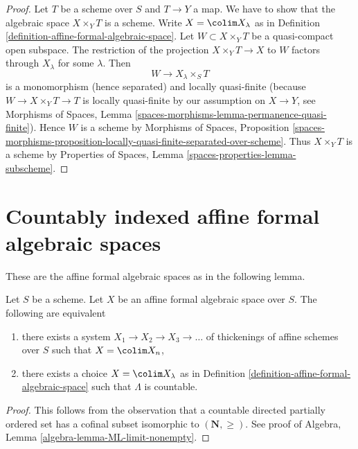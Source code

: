 \begin{proof}
Let $T$ be a scheme over $S$ and $T \to Y$ a map. We have to show that
the algebraic space $X \times_Y T$ is a scheme. Write $X = \colim X_\lambda$
as in Definition
\ref{definition-affine-formal-algebraic-space}.
Let $W \subset X \times_Y T$
be a quasi-compact open subspace. The restriction of the projection
$X \times_Y T \to X$ to $W$ factors through $X_\lambda$ for some $\lambda$.
Then
$$
W \to X_\lambda \times_S T
$$
is a monomorphism (hence separated) and locally quasi-finite (because
$W \to X \times_Y T \to T$ is locally quasi-finite by our assumption
on $X \to Y$, see Morphisms of Spaces, Lemma
\ref{spaces-morphisms-lemma-permanence-quasi-finite}).
Hence $W$ is a scheme by
Morphisms of Spaces, Proposition
\ref{spaces-morphisms-proposition-locally-quasi-finite-separated-over-scheme}.
Thus $X \times_Y T$ is a scheme by
Properties of Spaces, Lemma \ref{spaces-properties-lemma-subscheme}.
\end{proof}






\section{Countably indexed affine formal algebraic spaces}
\label{section-countably-indexed}

\noindent
These are the affine formal algebraic spaces as in the following lemma.

\begin{lemma}
\label{lemma-countable-affine-formal-algebraic-space}
Let $S$ be a scheme. Let $X$ be an affine formal algebraic space over $S$.
The following are equivalent
\begin{enumerate}
\item there exists a system $X_1 \to X_2 \to X_3 \to \ldots$
of thickenings of affine schemes over $S$ such that $X = \colim X_n$,
\item there exists a choice $X = \colim X_\lambda$ as in
Definition \ref{definition-affine-formal-algebraic-space}
such that $\Lambda$ is countable.
\end{enumerate}
\end{lemma}

\begin{proof}
This follows from the observation that a countable directed partially
ordered set has a cofinal subset isomorphic to $(\mathbf{N}, \geq)$.
See proof of Algebra, Lemma \ref{algebra-lemma-ML-limit-nonempty}.
\end{proof}

